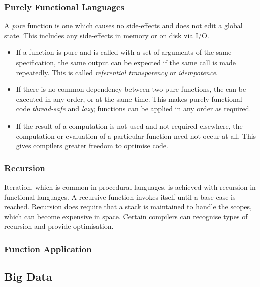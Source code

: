 \documentclass[10pt]{article}
\begin{document}
\subsubsection{Purely Functional Languages}
\label{sec:org183ebd5}

A \emph{pure} function is one which causes no side-effects and does not edit a global state. This includes any side-effects in memory or on disk via I/O.

\begin{itemize}
\item If a function is pure and is called with a set of arguments of the same specification, the same output can be expected if the same call is made repeatedly. This is called \emph{referential transparency} or \emph{idempotence}.

\item If there is no common dependency between two pure functions, the can be executed in any order, or at the same time. This makes purely functional code \emph{thread-safe} and \emph{lazy}; functions can be applied in any order as required.

\item If the result of a computation is not used and not required elsewhere, the computation or evaluation of a particular function need not occur at all. This gives compilers greater freedom to optimise code.
\end{itemize}

\subsubsection{Recursion}
\label{sec:orge56aec8}

Iteration, which is common in procedural languages, is achieved with recursion in functional languages. A recursive function invokes itself until a base case is reached. Recursion does require that a stack is maintained to handle the scopes, which can become expensive in space. Certain compilers can recognise types of recursion and provide optimisation.

\subsubsection{Function Application}
\label{sec:orgdfa7908}

\subsection{Big Data}
\label{sec:org0dd8149}
\end{document}
